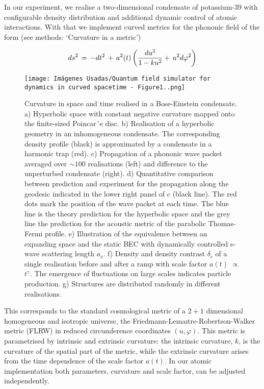 \documentclass[11pt,twocolumn,letterpaper]{article}
\newcounter{ns}
\begin{document}
In our experiment, we realise a two-dimensional condensate of potassium-39 with configurable density distribution and additional dynamic control of atomic interactions. With that we implement curved metrics for the phononic field of the form (see methods: ‘Curvature in a metric’)

\begin{equation}
    \label{Ecuación1}
    ds^{2} \thinspace = \thinspace -dt^{2} \thinspace + \thinspace a^{2}(t) \left( \frac{du^{2}}{1-ku^{2}} + \thinspace u^{2}d \varphi^{2} \right)
\end{equation}

\begin{figure*}[ht]
    \centering
    \texttt{[image: Imágenes Usadas/Quantum field simulator for dynamics in curved spacetime - Figure1..png]}
    \caption{Curvature in space and time realised in a Bose-Einstein condensate. a) Hyperbolic space with constant negative curvature mapped onto the finite-sized Poincar´e disc. b) Realisation of a hyperbolic geometry in an inhomogeneous condensate. The corresponding density profile (black) is approximated by a condensate in a harmonic trap (red). c) Propagation of a phononic wave packet averaged over $\sim 100$ realisations (left) and difference to the unperturbed condensate (right). d) Quantitative comparison between prediction and experiment for the propagation along the geodesic indicated in the lower right panel of c (black line). The red dots mark the position of the wave packet at each time. The blue line is the theory prediction for the hyperbolic space and the grey line the prediction for the acoustic metric of the parabolic Thomas-Fermi profile. e) Illustration of the equivalence between an expanding space and the static BEC with dynamically controlled s-wave scattering length $a_{s}$. f) Density and density contrast $\delta_{c}$ of a single realisation before and after a ramp with scale factor $a(t)$ $\propto$ $t^{\gamma}$. The emergence of fluctuations on large scales indicates particle production. g) Structures are distributed randomly in different realisations.
}
    \label{Figure1}
\end{figure*}

This corresponds to the standard cosmological metric of a $2 + 1$ dimensional homogeneous and isotropic universe, the Friedmann-Lemaıtre-Robertson-Walker metric (FLRW) in reduced circumference coordinates $(u, \varphi)$. This metric is parametrised by intrinsic and extrinsic curvature: the intrinsic curvature, $k$, is the curvature of the spatial part of the metric, while the extrinsic curvature arises from the time dependence of the scale factor $a(t)$.
In our atomic implementation both parameters, curvature and scale factor, can be adjusted independently.\\
\end{document}
